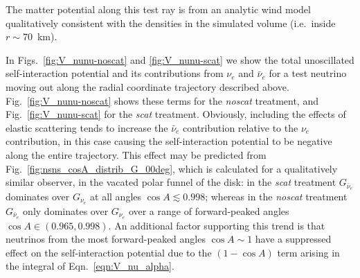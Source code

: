 \documentclass[aps,floatfix,prd,superscriptaddress,twocolumn]{revtex4-1}
\begin{document}
The matter potential along this test ray is from an analytic wind
model qualitatively consistent with the densities in the
simulated volume (i.e.\ inside $r\sim70$~km).

In Figs.~\ref{fig:V_nunu-noscat} and \ref{fig:V_nunu-scat}
we show the total unoscillated self-interaction potential
and its contributions from $\nu_e$ and $\bar{\nu}_e$ for a test neutrino
moving out along the radial coordinate trajectory described above.
Fig.~\ref{fig:V_nunu-noscat} shows these terms for the \emph{noscat} treatment,
and Fig.~\ref{fig:V_nunu-scat} for the \emph{scat} treatment.
Obviously, including the effects of elastic scattering tends to increase the
$\bar{\nu}_e$ contribution relative to the $\nu_e$ contribution,
in this case causing the self-interaction potential to be negative
along the entire trajectory.
This effect may be predicted from Fig.~\ref{fig:nsns_cosA_distrib_G_00deg},
which is calculated for a qualitatively similar observer, in the vacated polar
funnel of the disk:
in the \emph{scat} treatment $G_{\bar{\nu}_e}$ dominates over $G_{\nu_e}$ at
all angles $\cos A \lesssim 0.998$;
whereas in the \emph{noscat} treatment $G_{\bar{\nu}_e}$ only dominates over
$G_{\nu_e}$ over a range of forward-peaked angles $\cos A \in (0.965,0.998)$.
An additional factor supporting this trend is that neutrinos from the most
forward-peaked angles $\cos A \sim 1$ have a suppressed effect on the
self-interaction potential due to the $(1-\cos A)$ term arising in the integral
of Eqn.~\ref{eqn:V_nu_alpha}.
\end{document}
